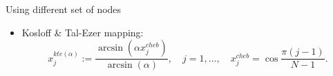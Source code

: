 \documentclass{beamer}
\begin{document}
\begin{frame}{Using different set of nodes}
  \begin{itemize}
    \item Kosloff \& Tal-Ezer mapping:
      \begin{equation*}
        x_j^{kte(\alpha)} := \frac{\arcsin(\alpha x_j^{cheb})}{\arcsin(\alpha)},
	\quad j = 1,\ldots, \quad x_j^{cheb} = \cos{\frac{\pi(j-1)}{N-1}}.
      \end{equation*}
  \end{itemize}

\end{frame}
\end{document}
